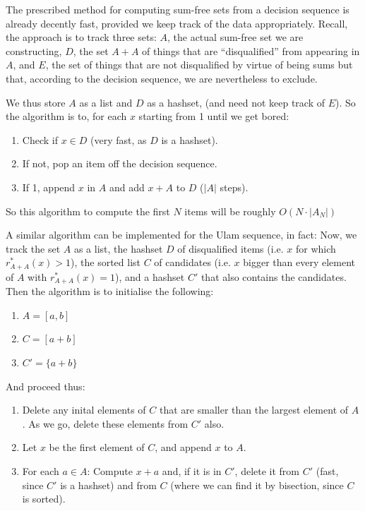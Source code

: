 \documentclass{report}
\theoremstyle{remark}
\numberwithin{equation}{section}
\begin{document}
The prescribed method for computing sum-free sets from a decision
sequence is already decently fast, provided we keep track of the data
appropriately.  Recall, the approach is to track three sets: $A$, the
actual sum-free set we are constructing, $D$, the set $A+A$ of things
that are ``disqualified'' from appearing in $A$, and $E$, the set of
things that are not disqualified by virtue of being sums but that,
according to the decision sequence, we are nevertheless to exclude.

We thus store $A$ as a list and $D$ as a hashset, (and need not keep
track of $E$).  So the algorithm is to, for each $x$ starting from 1
until we get bored:

\begin{enumerate}
\item Check if $x \in D$ (very fast, as $D$ is a hashset).  
\item If not, pop an item off the decision sequence.  
\item If 1, append $x$ in $A$ and add $x + A$ to $D$ ($|A|$ steps).
\end{enumerate}

So this algorithm to compute the first $N$ items will be roughly
$O(N \cdot |A_N|)$

A similar algorithm can be implemented for the Ulam sequence, in fact:
Now, we track the set $A$ as a list, the hashset $D$ of disqualified
items (i.e. $x$ for which $r^*_{A+A}(x) > 1$), the sorted list $C$ of
candidates (i.e. $x$ bigger than every element of $A$ with
$r^*_{A+A}(x) = 1$), and a hashset $C'$ that also contains the candidates.  Then the algorithm is to initialise the
following: 

\begin{enumerate}
\item $A = [a,b]$
\item $C = [a+b]$
\item $C' = \{a+b\}$
\end{enumerate}

And proceed thus: 

\begin{enumerate}
\item Delete any inital elements of $C$ that are smaller than the
  largest element of $A$.  As we go, delete these elements from $C'$
  also.
\item Let $x$ be the first element of $C$, and append $x$ to $A$.
\item For each $a \in A$: Compute $x + a$ and, if it is in $C'$,
  delete it from $C'$ (fast, since $C'$ is a hashset) and from $C$
  (where we can find it by bisection, since $C$ is sorted).
\end{enumerate}
\end{document}

